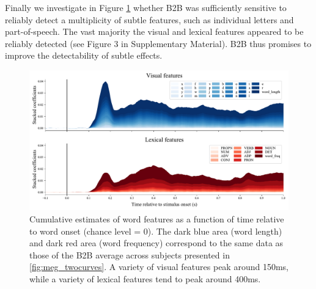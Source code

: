 Finally we investigate in Figure \ref{fig:megresult} whether B2B was sufficiently sensitive to reliably detect a multiplicity of subtle features, such as individual letters and part-of-speech. The vast majority the visual and lexical features appeared to be reliably detected (see Figure 3 in Supplementary Material). B2B thus promises to improve the detectability of subtle effects.

\begin{figure}
  \centering
  \includegraphics[width=\textwidth, trim=0cm 0cm 0cm 0cm, clip=True]{figures/meg_result.pdf}
  \caption{Cumulative estimates of word features as a function of time relative to word onset (chance level = 0). The dark blue area (word length) and dark red area (word frequency) correspond to the same data as those of the B2B average across subjects presented in \ref{fig:meg_twocurves}. A variety of visual features peak around 150ms, while a variety of lexical features tend to peak around 400ms.}
  \label{fig:megresult}
\end{figure}
